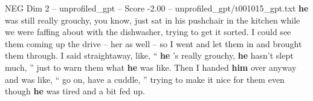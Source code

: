 \begin{textsample}{NEG Dim 2 – unprofiled\_gpt – Score -2.00 – unprofiled\_gpt/t001015\_gpt.txt}  \label{ex:f2_neg_028}
\textbf{he} was still really grouchy, you know, just sat in his pushchair in the kitchen while we were faffing about with the dishwasher, trying to get it sorted.
I could see them coming up the drive – her as well – so I went and let them in and brought them through.
I said straightaway, like, “ \textbf{he} ’s really grouchy, \textbf{he} hasn't slept much, ” just to warn them what \textbf{he} was like.
Then I handed \textbf{him} over anyway and was like, “ go on, have a cuddle, ” trying to make it nice for them even though \textbf{he} was tired and a bit fed up.

\end{textsample}
